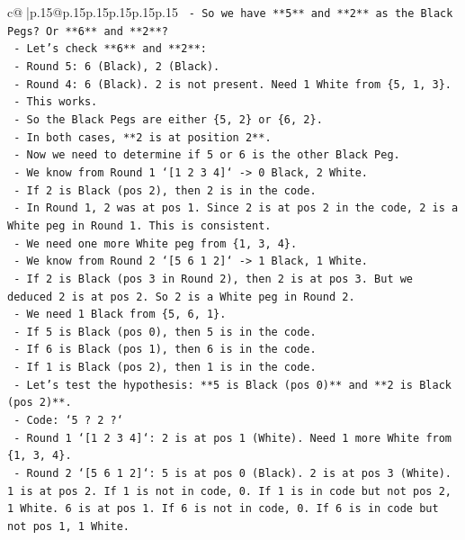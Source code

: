 \documentclass{article}
\begin{document}
{\begin{supertabular}{c@{$\;$}|p{.15\linewidth}@{}p{.15\linewidth}p{.15\linewidth}p{.15\linewidth}p{.15\linewidth}p{.15\linewidth}}
{{{\texttt{        {-} So we have **5** and **2** as the Black Pegs? Or **6** and **2**?} \\
\texttt{        {-} Let's check **6** and **2**:} \\
\texttt{            {-} Round 5: 6 (Black), 2 (Black).} \\
\texttt{            {-} Round 4: 6 (Black). 2 is not present. Need 1 White from \{5, 1, 3\}.} \\
\texttt{            {-} This works.} \\
\texttt{        {-} So the Black Pegs are either \{5, 2\} or \{6, 2\}.} \\
\texttt{        {-} In both cases, **2 is at position 2**.} \\
\texttt{        {-} Now we need to determine if 5 or 6 is the other Black Peg.} \\
\texttt{        {-} We know from Round 1 `{[}1 2 3 4{]}` {-}> 0 Black, 2 White.} \\
\texttt{            {-} If 2 is Black (pos 2), then 2 is in the code.} \\
\texttt{            {-} In Round 1, 2 was at pos 1. Since 2 is at pos 2 in the code, 2 is a White peg in Round 1. This is consistent.} \\
\texttt{            {-} We need one more White peg from \{1, 3, 4\}.} \\
\texttt{        {-} We know from Round 2 `{[}5 6 1 2{]}` {-}> 1 Black, 1 White.} \\
\texttt{            {-} If 2 is Black (pos 3 in Round 2), then 2 is at pos 3. But we deduced 2 is at pos 2. So 2 is a White peg in Round 2.} \\
\texttt{            {-} We need 1 Black from \{5, 6, 1\}.} \\
\texttt{            {-} If 5 is Black (pos 0), then 5 is in the code.} \\
\texttt{            {-} If 6 is Black (pos 1), then 6 is in the code.} \\
\texttt{            {-} If 1 is Black (pos 2), then 1 is in the code.} \\
\texttt{        {-} Let's test the hypothesis: **5 is Black (pos 0)** and **2 is Black (pos 2)**.} \\
\texttt{            {-} Code: `5 ? 2 ?`} \\
\texttt{            {-} Round 1 `{[}1 2 3 4{]}`: 2 is at pos 1 (White). Need 1 more White from \{1, 3, 4\}.} \\
\texttt{            {-} Round 2 `{[}5 6 1 2{]}`: 5 is at pos 0 (Black). 2 is at pos 3 (White). 1 is at pos 2. If 1 is not in code, 0. If 1 is in code but not pos 2, 1 White. 6 is at pos 1. If 6 is not in code, 0. If 6 is in code but not pos 1, 1 White.} \\
}}}
\end{supertabular}}
\end{document}
